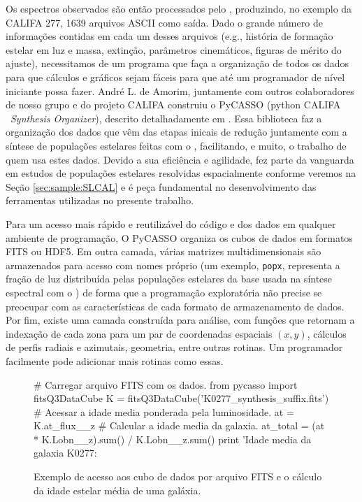 Os espectros observados são então processados pelo \starlight, produzindo, no exemplo da CALIFA 277, 1639 arquivos ASCII como saída. Dado o grande número de informações contidas em cada um desses arquivos (e.g., história de formação estelar em luz e massa, extinção, parâmetros cinemáticos, figuras de mérito do ajuste), necessitamos de um programa que faça a organização de todos os dados para que cálculos e gráficos sejam fáceis para que até um programador de nível iniciante possa fazer. André L. de Amorim, juntamente com outros colaboradores de nosso grupo e do projeto CALIFA construiu o PyCASSO ({\sc python} CALIFA \STARLIGHT\ {\em Synthesis Organizer}), descrito detalhadamente em \citet{deAmorim.etal.2017}. Essa biblioteca faz a organização dos dados que vêm das etapas inicais de redução juntamente com a síntese de populações estelares feitas com o \starlight, facilitando, e muito, o trabalho de quem usa estes dados. Devido a sua eficiência e agilidade, fez parte da vanguarda em estudos de populações estelares resolvidas espacialmente conforme veremos na Seção \ref{sec:sample:SLCAL} e é peça fundamental no desenvolvimento das ferramentas utilizadas no presente trabalho.

Para um acesso mais rápido e reutilizável do código e dos dados em qualquer ambiente de programação, O PyCASSO organiza os cubos de dados em formatos FITS ou HDF5. Em outra camada, várias matrizes multidimensionais são armazenados para acesso com nomes próprio (um exemplo, \texttt{popx}, representa a fração de luz distribuída pelas populações estelares da base usada na síntese espectral com o \starlight) de forma que a programação exploratória não precise se preocupar com as características de cada formato de armazenamento de dados. Por fim, existe uma camada construída para análise, com funções que retornam a indexação de cada zona para um par de coordenadas espaciais $(x, y)$, cálculos de perfis radiais e azimutais, geometria, entre outras rotinas. Um programador facilmente pode adicionar mais rotinas como essas.

\begin{figure}
	\begin{python}
# Carregar arquivo FITS com os dados.
from pycasso import fitsQ3DataCube
K = fitsQ3DataCube('K0277_synthesis_suffix.fits')
# Acessar a idade media ponderada pela luminosidade.
at = K.at_flux__z
# Calcular a idade media da galaxia.
at_total = (at * K.Lobn__z).sum() / K.Lobn__z.sum()
print 'Idade media da galaxia K0277: %
	\end{python}
	\caption[Exemplo de programa utilizando PyCASSO.]
	{Exemplo de acesso aos cubo de dados por arquivo FITS e o cálculo da idade estelar média de uma galáxia.}
	\label{fig:dataAccess}
\end{figure}

